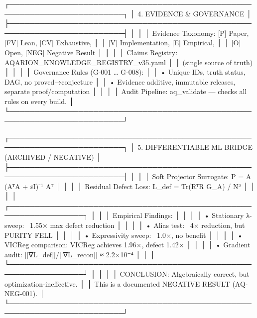 {{{{{{{{{{{{{┌─────────────────────────────────────────────────────────────────────────┐
│                  4. EVIDENCE & GOVERNANCE                               │
├─────────────────────────────────────────────────────────────────────────┤
│                                                                         │
│   Evidence Taxonomy: [P] Paper, [FV] Lean, [CV] Exhaustive,            │
│                      [V] Implementation, [E] Empirical,                 │
│                      [O] Open, [NEG] Negative Result                    │
│                                                                         │
│   Claims Registry: AQARION_KNOWLEDGE_REGISTRY_v35.yaml                  │
│                   (single source of truth)                              │
│                                                                         │
│   Governance Rules (G-001 … G-008):                                    │
│   • Unique IDs, truth status, DAG, no proved→conjecture                │
│   • Evidence additive, immutable releases, separate proof/computation   │
│                                                                         │
│   Audit Pipeline: aq_validate — checks all rules on every build.        │
└─────────────────────────────────────────────────────────────────────────┘

┌─────────────────────────────────────────────────────────────────────────┐
│             5. DIFFERENTIABLE ML BRIDGE (ARCHIVED / NEGATIVE)           │
├─────────────────────────────────────────────────────────────────────────┤
│                                                                         │
│   Soft Projector Surrogate: P = A (AᵀA + εI)⁻¹ Aᵀ                       │
│                                                                         │
│   Residual Defect Loss: L_def = Tr(RᵀR G_A) / N²                       │
│                                                                         │
│   ┌─────────────────────────────────────────────────────────────────┐ │
│   │  Empirical Findings:                                             │ │
│   │  • Stationary λ-sweep: ~1.55× max defect reduction               │ │
│   │  • Alias test: ~4× reduction, but PURITY FELL                    │ │
│   │  • Expressivity sweep: ~1.0×, no benefit                         │ │
│   │  • VICReg comparison: VICReg achieves 1.96×, defect 1.42×       │ │
│   │  • Gradient audit: ||∇L_def||/||∇L_recon|| ≈ 2.2×10⁻⁴          │ │
│   └─────────────────────────────────────────────────────────────────┘ │
│                                                                         │
│   CONCLUSION: Algebraically correct, but optimization-ineffective.     │
│   This is a documented NEGATIVE RESULT (AQ-NEG-001).                   │
└─────────────────────────────────────────────────────────────────────────┘

}}}}}}}}}}}}}
